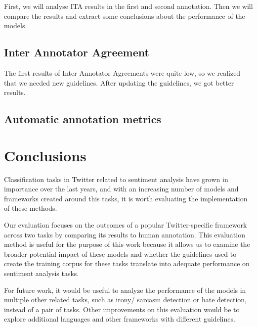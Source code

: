 \documentclass[11pt,a4paper]{article}
\begin{document}
First, we will analyse ITA results in the first and second annotation.
Then we will compare the results and extract some conclusions about the performance of the models.

\subsection{Inter Annotator Agreement}
The first results of Inter Annotator Agreements were quite low, so we realized that we needed new guidelines. After updating the guidelines, we got better results. %

\subsection{Automatic annotation metrics}

\section{Conclusions}

Classification tasks in Twitter related to sentiment analysis have grown in importance over the last years, and with an increasing number of models and frameworks created around this tasks, it is worth evaluating the implementation of these methods. 

Our evaluation focuses on the outcomes of a popular Twitter-specific framework across two tasks by comparing its results to human annotation. This evaluation method is useful for the purpose of this work because it allows us to examine the broader potential impact of these models and whether the guidelines used to create the training corpus for these tasks translate into adequate performance on sentiment analysis tasks.

For future work, it would be useful to analyze the performance of the models in multiple other related tasks, such as irony/ sarcasm detection or hate detection, instead of a pair of tasks. Other improvements on this evaluation would be to explore additional languages and other frameworks with different guidelines.



\end{document}
